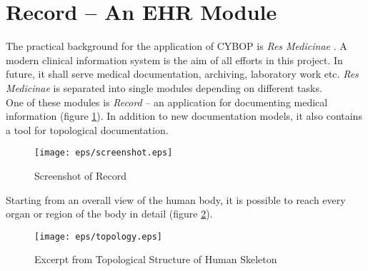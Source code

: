 %
%
%
%
%
%
%

\section{Record -- An EHR Module}
\label{record_an_ehr_module_heading}

The practical background for the application of CYBOP is \emph{Res Medicinae}
\cite{resmedicinae}. A modern clinical information system is the aim of all efforts
in this project. In future, it shall serve medical documentation, archiving,
laboratory work etc. \emph{Res Medicinae} is separated into single modules depending
on different tasks.\\
One of these modules is \emph{Record} -- an application for documenting medical
information (figure \ref{record_figure}). In addition to new documentation models,
it also contains a tool for topological documentation.

\begin{figure}[ht]
    \begin{center}
       \texttt{[image: eps/screenshot.eps]}
       \caption{Screenshot of Record \cite{urban}}
       \label{record_figure}
    \end{center}
\end{figure}

Starting from an overall view of the human body, it is possible to reach every
organ or region of the body in detail (figure \ref{topology_figure}).

\begin{figure}[ht]
    \begin{center}
       \texttt{[image: eps/topology.eps]}
       \caption{Excerpt from Topological Structure of Human Skeleton}
       \label{topology_figure}
    \end{center}
\end{figure}

